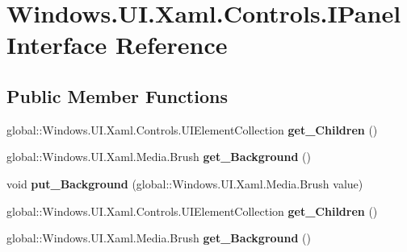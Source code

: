 \hypertarget{interface_windows_1_1_u_i_1_1_xaml_1_1_controls_1_1_i_panel}{}\section{Windows.\+U\+I.\+Xaml.\+Controls.\+I\+Panel Interface Reference}
\label{interface_windows_1_1_u_i_1_1_xaml_1_1_controls_1_1_i_panel}
\subsection*{Public Member Functions}
\begin{DoxyCompactItemize}
\item 
\mbox{\label{interface_windows_1_1_u_i_1_1_xaml_1_1_controls_1_1_i_panel_a349351ef3068b2b0cb13a73833ff01df}} 
global\+::\+Windows.\+U\+I.\+Xaml.\+Controls.\+U\+I\+Element\+Collection {\bfseries get\+\_\+\+Children} ()
\item 
\mbox{\label{interface_windows_1_1_u_i_1_1_xaml_1_1_controls_1_1_i_panel_a5fbb285baf86c6114b6c3c7aa1f0395f}} 
global\+::\+Windows.\+U\+I.\+Xaml.\+Media.\+Brush {\bfseries get\+\_\+\+Background} ()
\item 
\mbox{\label{interface_windows_1_1_u_i_1_1_xaml_1_1_controls_1_1_i_panel_afeaa387907f957a8e159050c2a81c6f1}} 
void {\bfseries put\+\_\+\+Background} (global\+::\+Windows.\+U\+I.\+Xaml.\+Media.\+Brush value)
\item 
\mbox{\label{interface_windows_1_1_u_i_1_1_xaml_1_1_controls_1_1_i_panel_a349351ef3068b2b0cb13a73833ff01df}} 
global\+::\+Windows.\+U\+I.\+Xaml.\+Controls.\+U\+I\+Element\+Collection {\bfseries get\+\_\+\+Children} ()
\item 
\mbox{\label{interface_windows_1_1_u_i_1_1_xaml_1_1_controls_1_1_i_panel_a5fbb285baf86c6114b6c3c7aa1f0395f}} 
global\+::\+Windows.\+U\+I.\+Xaml.\+Media.\+Brush {\bfseries get\+\_\+\+Background} ()
\item 
\mbox{\label{interface_windows_1_1_u_i_1_1_xaml_1_1_controls_1_1_i_panel_afeaa387907f957a8e159050c2a81c6f1}} 

\end{DoxyCompactItemize}
